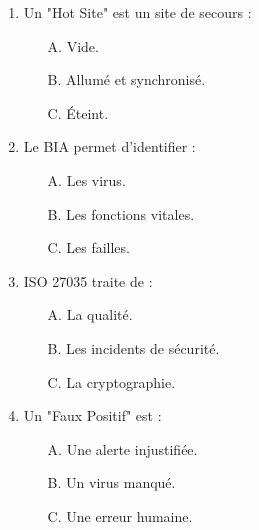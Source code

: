 \begin{enumerate}
    \item Un "Hot Site" est un site de secours :
    \begin{itemize} \item[A.] Vide. \item[B.] Allumé et synchronisé. \item[C.] Éteint. \end{itemize}
    \item Le BIA permet d'identifier :
    \begin{itemize} \item[A.] Les virus. \item[B.] Les fonctions vitales. \item[C.] Les failles. \end{itemize}
    \item ISO 27035 traite de :
    \begin{itemize} \item[A.] La qualité. \item[B.] Les incidents de sécurité. \item[C.] La cryptographie. \end{itemize}
    \item Un "Faux Positif" est :
    \begin{itemize} \item[A.] Une alerte injustifiée. \item[B.] Un virus manqué. \item[C.] Une erreur humaine. \end{itemize}
\end{enumerate}

